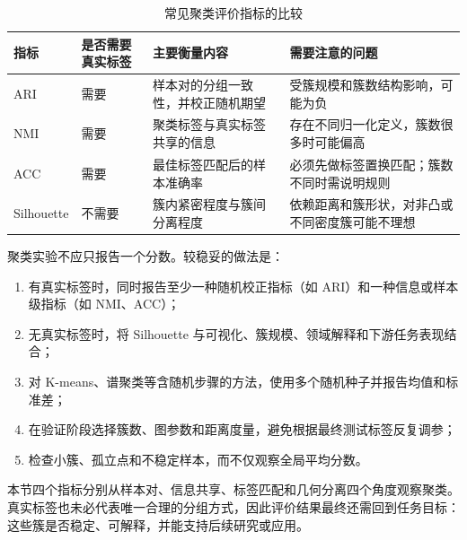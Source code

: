 \documentclass[UTF8,zihao=-4,openany]{ctexbook}
\begin{document}
\begin{table}[htbp]
  \centering
  \caption{常见聚类评价指标的比较}
  \label{tab:clustering-metrics-comparison}
  \small
  \renewcommand{\arraystretch}{1.18}
  \begin{tabular}{
    >{\raggedright\arraybackslash}p{2.2cm}
    >{\raggedright\arraybackslash}p{2.5cm}
    >{\raggedright\arraybackslash}p{4.2cm}
    >{\raggedright\arraybackslash}p{4.3cm}}
    \toprule
    指标 & 是否需要真实标签 & 主要衡量内容 & 需要注意的问题 \\
    \midrule
    ARI
      & 需要
      & 样本对的分组一致性，并校正随机期望
      & 受簇规模和簇数结构影响，可能为负 \\
    NMI
      & 需要
      & 聚类标签与真实标签共享的信息
      & 存在不同归一化定义，簇数很多时可能偏高 \\
    ACC
      & 需要
      & 最佳标签匹配后的样本准确率
      & 必须先做标签置换匹配；簇数不同时需说明规则 \\
    Silhouette
      & 不需要
      & 簇内紧密程度与簇间分离程度
      & 依赖距离和簇形状，对非凸或不同密度簇可能不理想 \\
    \bottomrule
  \end{tabular}
\end{table}

聚类实验不应只报告一个分数。较稳妥的做法是：

\begin{enumerate}[itemsep=2pt,topsep=4pt]
  \item 有真实标签时，同时报告至少一种随机校正指标（如 ARI）和一种信息或样本级指标（如 NMI、ACC）；
  \item 无真实标签时，将 Silhouette 与可视化、簇规模、领域解释和下游任务表现结合；
  \item 对 K-means、谱聚类等含随机步骤的方法，使用多个随机种子并报告均值和标准差；
  \item 在验证阶段选择簇数、图参数和距离度量，避免根据最终测试标签反复调参；
  \item 检查小簇、孤立点和不稳定样本，而不仅观察全局平均分数。
\end{enumerate}

本节四个指标分别从样本对、信息共享、标签匹配和几何分离四个角度观察聚类。真实标签也未必代表唯一合理的分组方式，因此评价结果最终还需回到任务目标：这些簇是否稳定、可解释，并能支持后续研究或应用。
\end{document}
